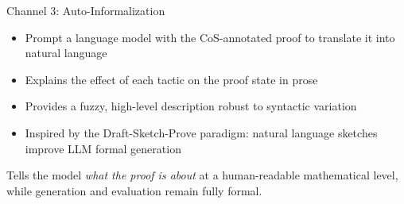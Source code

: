 \begin{frame}{Channel 3: Auto-Informalization}
\vspace{0.8em}
\begin{itemize}\setlength{\itemsep}{10pt}
  \item Prompt a language model with the CoS-annotated proof to translate it into natural language
  \item Explains the effect of each tactic on the proof state in prose
  \item Provides a fuzzy, high-level description robust to syntactic variation
  \item Inspired by the Draft-Sketch-Prove paradigm: natural language sketches improve LLM formal generation
\end{itemize}
\vspace{0.8em}
\begin{exampleblock}{}
  Tells the model \emph{what the proof is about} at a human-readable mathematical level, while generation and evaluation remain fully formal.
\end{exampleblock}
\end{frame}

